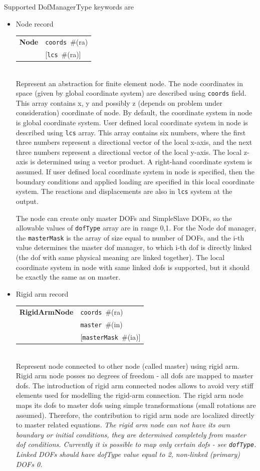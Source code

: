 \documentclass[a4paper]{article}
\makeatletter
\newcommand{\param}[1]{\texttt{#1}} %
\newcommand{\optional}[1]{[#1]} %
\newcommand{\field}[2]{\param{#1}~\#{\tiny(#2)}} %
\newcommand{\optField}[2]{\optional{\field{#1}{#2}}}
\newcommand{\entKeywordInst}[1]{\textbf{#1}} %
\newenvironment{record}[1][]{\begin{tabular}{|ll}}{\end{tabular}\\}
\newcommand{\recentry}[2]{{#1}&{#2}\\}
\newcounter{rcc}
\newenvironment{record}[1][\textwidth]{\setcounter{rcc}{0}\begin{tabular*}{#1}{|ll@{\extracolsep{\fill}}r}}{\end{tabular*}\\}
\newcommand{\recentry}[2]{\ifthenelse{\value{rcc}>0}{&$\backslash$ \\}{\setcounter{rcc}{1}}{#1}&{#2}}
\makeatother
\begin{document}
Supported DofManagerType keywords are
\begin{itemize}
\item Node record

\begin{record}[0.9\textwidth]
  \recentry{\entKeywordInst{Node}}{\field{coords}{ra}}
  \recentry{}{[\field{lcs}{ra}]}
\end{record}
Represent an abstraction for finite element node.
The node coordinates in space (given by global coordinate system) are described
using \param{coords} field. This array contains x, y and possibly z
(depends on problem under consideration) coordinate of node.
By default, the coordinate system in node is global coordinate system.
User defined local coordinate system in node is described using \param{lcs} array. This
array contains six numbers, where the first three numbers represent
a directional vector of the local x-axis, and the next three numbers represent
a directional vector of the local y-axis. The local z-axis is determined
using a vector product. A right-hand coordinate system is assumed.
If user defined local coordinate system in node is specified, then the
boundary conditions and applied loading are specified in this local coordinate system.
The reactions and displacements are also in \param{lcs} system at the output.

The node can create only master DOFs and SimpleSlave DOFs, so the
allowable values of \param{dofType} array are in range {0,1}.
For the Node dof manager, the \param{masterMask} is the array of size
equal to number of DOFs, and the i-th value determines the
master dof manager, to which i-th dof is directly linked (the dof with
same physical meaning are linked together).
The local coordinate
system in node with same linked dofs is supported, but it should be exactly the
same as on master.


\item Rigid arm record

\begin{record}[0.9\textwidth]
  \recentry{\entKeywordInst{RigidArmNode}}{\field{coords}{ra}}
  \recentry{}{\field{master}{in}}
  \recentry{}{\optField{masterMask}{ia}}
\end{record}
Represent node connected to other node (called master) using rigid
arm. Rigid arm node posses no degrees of freedom - all dofs are mapped to master
dofs. The introduction of rigid arm connected nodes allows to avoid very
stiff elements used for modelling the rigid-arm connection.
The rigid arm node maps its dofs to master dofs using simple transformations
(small rotations are assumed). Therefore, the contribution to rigid
arm node are localized directly to master related equations.
{\em The rigid arm node can not have its own boundary or initial conditions, they are
determined completely from master dof conditions. Currently it is
possible to map only certain dofs - see \param{dofType}. Linked DOFs
should have dofType value equal to 2, non-linked (primary) DOFs 0.}


\end{itemize}
\end{document}
